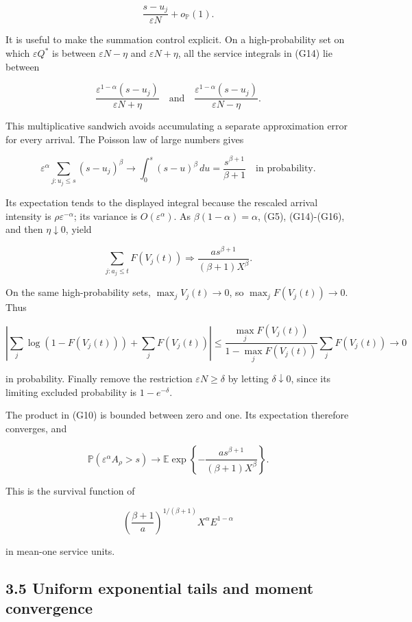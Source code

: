 \documentclass[
  11pt,
  a4paper,
]{scrartcl}
\begin{document}
\[
\frac{s-u_j}{\varepsilon N}+o_{\mathbb P}(1).
\tag{G15}
\]

It is useful to make the summation control explicit. On a
high-probability set on which \(\varepsilon Q^*\) is between
\(\varepsilon N-\eta\) and \(\varepsilon N+\eta\), all the service
integrals in (G14) lie between

\[
\frac{\varepsilon^{1-\alpha}(s-u_j)}{\varepsilon N+\eta}
\quad\text{and}\quad
\frac{\varepsilon^{1-\alpha}(s-u_j)}{\varepsilon N-\eta}.
\]

This multiplicative sandwich avoids accumulating a separate
approximation error for every arrival. The Poisson law of large numbers
gives

\[
\varepsilon^\alpha\sum_{j:u_j\leq s}(s-u_j)^\beta
\longrightarrow\int_0^s(s-u)^\beta\,du
=\frac{s^{\beta+1}}{\beta+1}
\quad\text{in probability}.
\tag{G16}
\]

Its expectation tends to the displayed integral because the rescaled
arrival intensity is \(\rho\varepsilon^{-\alpha}\); its variance is
\(O(\varepsilon^\alpha)\). As \(\beta(1-\alpha)=\alpha\), (G5),
(G14)-(G16), and then \(\eta\downarrow0\), yield

\[
\sum_{j:a_j\leq t}F(V_j(t))
\Rightarrow \frac{a s^{\beta+1}}{(\beta+1)X^\beta}.
\tag{G17}
\]

On the same high-probability sets, \(\max_j V_j(t)\to0\), so
\(\max_j F(V_j(t))\to0\). Thus

\[
\left|\sum_j\log(1-F(V_j(t)))+\sum_jF(V_j(t))\right|
\leq\frac{\max_jF(V_j(t))}{1-\max_jF(V_j(t))}\sum_jF(V_j(t))
\to0
\]

in probability. Finally remove the restriction
\(\varepsilon N\geq\delta\) by letting \(\delta\downarrow0\), since its
limiting excluded probability is \(1-e^{-\delta}\).

The product in (G10) is bounded between zero and one. Its expectation
therefore converges, and

\[
\mathbb P(\varepsilon^\alpha A_\rho>s)
\longrightarrow
\mathbb E\exp\left\{-\frac{a s^{\beta+1}}{(\beta+1)X^\beta}\right\}.
\tag{G18}
\]

This is the survival function of

\[
\left(\frac{\beta+1}{a}\right)^{1/(\beta+1)}X^\alpha E^{1-\alpha}
\]

in mean-one service units.

\subsection{3.5 Uniform exponential tails and moment
convergence}\label{uniform-exponential-tails-and-moment-convergence}
\end{document}
